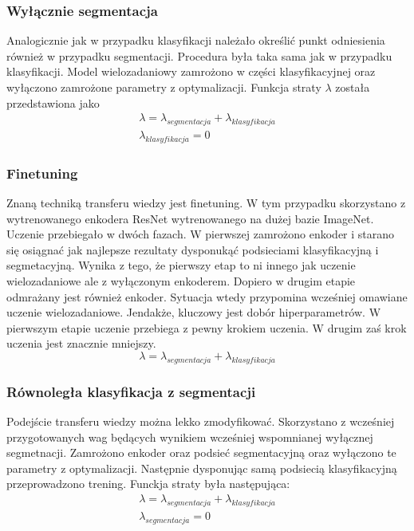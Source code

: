 \subsubsection{Wyłącznie segmentacja}
Analogicznie jak w przypadku klasyfikacji należało określić punkt odniesienia również w przypadku segmentacji. Procedura była taka sama jak w przypadku klasyfikacji. Model wielozadaniowy zamrożono w części klasyfikacyjnej oraz wyłączono zamrożone parametry z optymalizacji. Funkcja straty $\lambda$ została przedstawiona jako
\begin{gather*}
    \lambda = \lambda_{segmentacja} + \lambda_{klasyfikacja} \\
    \lambda_{klasyfikacja} = 0
\end{gather*}
\subsubsection{Finetuning}
Znaną techniką transferu wiedzy jest finetuning. W tym przypadku skorzystano z wytrenowanego enkodera ResNet wytrenowanego na dużej bazie ImageNet. Uczenie przebiegało w dwóch fazach. W pierwszej zamrożono enkoder i starano się osiągnać jak najlepsze rezultaty dysponukąć podsieciami klasyfikacyjną i segmetacyjną. Wynika z tego, że pierwszy etap to ni innego jak uczenie wielozadaniowe ale z wyłączonym enkoderem. Dopiero w drugim etapie odmrażany jest również enkoder. Sytuacja wtedy przypomina wcześniej omawiane uczenie wielozadaniowe. Jendakże, kluczowy jest dobór hiperparametrów. W pierwszym etapie uczenie przebiega z pewny krokiem uczenia. W drugim zaś krok uczenia jest znacznie mniejszy.
\begin{equation*}
    \lambda = \lambda_{segmentacja} + \lambda_{klasyfikacja}
\end{equation*}
\subsubsection{Równoległa klasyfikacja z segmentacji}
Podejście transferu wiedzy można lekko zmodyfikować. Skorzystano z wcześniej przygotowanych wag będących wynikiem wcześniej wspomnianej wyłącznej segmetnacji. Zamrożono enkoder oraz podsieć segmentacyjną oraz wyłączono te parametry z optymalizacji. Następnie dysponując samą podsiecią klasyfikacyjną przeprowadzono trening. Funckja straty była następująca:
\begin{gather*}
    \lambda = \lambda_{segmentacja} + \lambda_{klasyfikacja} \\
    \lambda_{segmentacja} = 0
\end{gather*}
